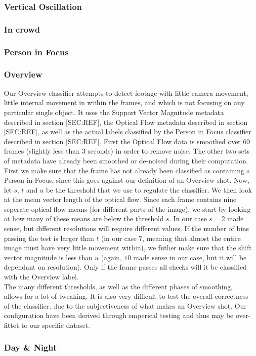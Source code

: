 \subsubsection{Vertical Oscillation}
%

%
\subsubsection{In crowd}
%

%
\subsubsection{Person in Focus}
%

%
\subsubsection{Overview}
%
Our Overview classifier attempts to detect footage with little camera movement, little internal movement in within the frames, and which is not focusing on any particular single object. It uses the Support Vector Magnitude metadata described in section [SEC:REF], the Optical Flow metadata described in section [SEC:REF], as well as the actual labels classified by the Person in Focus classifier described in section [SEC:REF]. First the Optical Flow data is smoothed over 60 frames (slightly less than 3 seconds) in order to remove noise. The other two sets of metadata have already been smoothed or de-noised during their computation.\\
First we make sure that the frame has not already been classified as containing a Person in Focus, since this goes against our definition of an Overview shot. Now, let $s$, $t$ and $u$ be the threshold that we use to regulate the classifier. We then look at the mean vector length of the optical flow. Since each frame contains nine seperate optical flow means (for different parts of the image), we start by looking at how many of these means are below the threshold $s$. In our case $s=2$ made sense, but different resolutions will require different values. If the number of bins passing the test is larger than $t$ (in our case $7$, meaning that almost the entire image must have very little movement within), we futher make sure that the shift vector magnitude is less than $u$ (again, $10$ made sense in our case, but it will be dependant on resolution). Only if the frame passes all checks will it be classified with the Overview label.\\
The many different thresholds, as well as the different phases of smoothing, allows for a lot of tweaking. It is also very difficult to test the overall correctness of the classifier, due to the subjectiveness of what makes an Overview shot. Our configuration have been derived through emperical testing and thus may be over-fittet to our specific dataset.
%
\subsubsection{Day \& Night}
%
